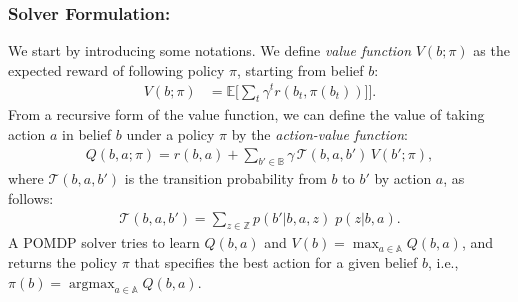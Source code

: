 \documentclass[letterpaper]{article} %
\newcommand{\ph}[1]{{\textbf{#1}:}} %
\newcommand{\argmax}{\mathop{\mathrm{argmax}}}
\begin{document}
\subsubsection{Solver Formulation:} \hfill
\vspace{-0.25pt}

\noindent
We start by introducing some notations.
We define \textit{value function} $V(b; \pi)$ as the expected reward of following policy $\pi$, starting from belief $b$:
\begin{align}
  V(b; \pi) &= \mathbb{E} \Big[ \sum_t \gamma^t r(b_t, \pi(b_t))] \Big].
\end{align}
%
%
From a recursive form of the value function, we can define the value of taking action $a$ in belief $b$ under a policy $\pi$ by the \textit{action-value function}:
\begin{align}
  Q(b, a; \pi) = r(b, a) + \sum_{b' \in \mathbb{B}} \gamma \, \mathcal{T}(b, a, b') \, V(b'; \pi),
  \label{eq:q_function}
\end{align}
where $\mathcal{T}(b, a, b')$ is the transition probability from $b$ to $b'$ by action $a$, as follows:
\begin{align}
  \mathcal{T}(b, a, b') = \sum_{z \in \mathbb{Z}} p(b' | b, a, z) \; p(z | b, a).
\end{align}
A POMDP solver tries to learn $Q(b, a)$ and $V(b) = \max_{a \in \mathbb{A}} Q(b, a)$, and returns the policy $\pi$ that specifies the best action for a given belief $b$, i.e., $\pi(b) = \argmax_{a \in \mathbb{A}} Q(b, a)$.
\end{document}
